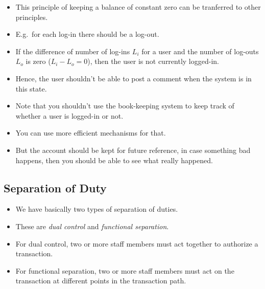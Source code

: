\documentclass{beamer}
\begin{document}
\begin{frame}{\insertsubsectionhead}
  \begin{itemize}
    \item This principle of keeping a balance of constant zero can be 
      tranferred to other principles.

    \item E.g.\ for each log-in there should be a log-out.

    \item If the difference of number of log-ins \(L_i\) for a user and the 
      number of log-outs \(L_o\) is zero (\(L_i-L_o = 0\)), then the user is 
      not currently logged-in.

    \item Hence, the user shouldn't be able to post a comment when the system 
      is in this state.
  \end{itemize}
\end{frame}

\begin{frame}{\insertsubsectionhead}
  \begin{itemize}
    \item Note that you shouldn't use the book-keeping system to keep track of 
      whether a user is logged-in or not.

    \item You can use more efficient mechanisms for that.

    \item But the account should be kept for future reference, in case 
      something bad happens, then you should be able to see what really 
      happened.
  \end{itemize}
\end{frame}

\subsection{Separation of Duty}

\begin{frame}{\insertsubsectionhead}
  \begin{itemize}
    \item We have basically two types of separation of duties.
      
    \item These are \emph{dual control} and \emph{functional separation}.

    \item For dual control, two or more staff members must act together to 
      authorize a transaction.

    \item For functional separation, two or more staff members must act on the 
      transaction at different points in the transaction path.
  \end{itemize}
\end{frame}
\end{document}
